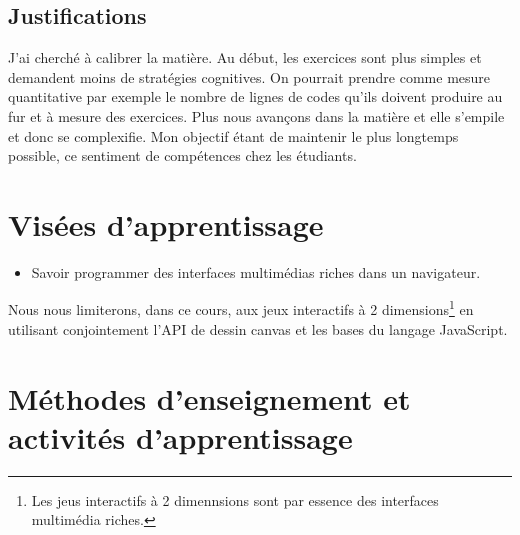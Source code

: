 \subsection{Justifications}

J'ai cherché à calibrer la matière. Au début, les exercices sont plus simples et demandent moins de stratégies cognitives. On pourrait prendre comme mesure quantitative par exemple le nombre de lignes de codes qu'ils doivent produire au fur et à mesure
des exercices. Plus nous avançons dans la matière et elle s’empile et donc se complexifie. Mon objectif étant de maintenir le plus longtemps possible, ce sentiment de compétences\cite{viau1994motivation} chez les étudiants.

\clearpage
\section{Visées d’apprentissage}
\begin{itemize}
    \item Savoir programmer des interfaces multimédias riches dans un navigateur.
\end{itemize}

Nous nous limiterons, dans ce cours, aux jeux interactifs à 2 dimensions\footnote{Les jeus interactifs à 2 dimennsions sont par essence des interfaces multimédia riches.} en utilisant conjointement l’API de dessin canvas et les bases du langage JavaScript.

\section{Méthodes d’enseignement et activités d’apprentissage}

